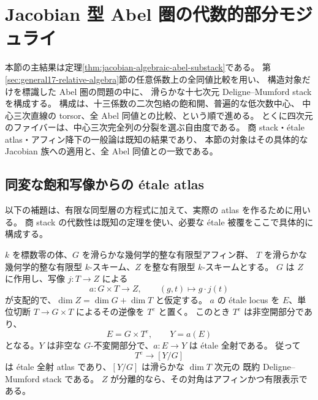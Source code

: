 \section{Jacobian 型 Abel 圏の代数的部分モジュライ}
\label{sec:jacobian-algebraic-chart}

本節の主結果は定理\ref{thm:jacobian-algebraic-abel-substack}である。
第\ref{sec:general17-relative-algebra}節の任意係数上の全同値比較を用い、
構造対象だけを標識した Abel 圏の問題の中に、
滑らかな十七次元 Deligne--Mumford stack を構成する。
構成は、十三係数の二次包絡の飽和開、普遍的な低次数中心、
中心三次直線の torsor、全 Abel 同値との比較、という順で進める。
とくに四次元のファイバーは、中心三次完全列の分裂を選ぶ自由度である。
商 stack・étale atlas・アフィン降下の一般論は既知の結果であり、
本節の対象はその具体的な Jacobian 族への適用と、全 Abel 同値との一致である。

\subsection{同変な飽和写像からの étale atlas}

以下の補題は、有限な同型層の方程式に加えて、実際の atlas を作るために用いる。
商 stack の代数性は既知の定理を使い、必要な étale 被覆をここで具体的に構成する。

\begin{lemma}[等次元な同変飽和写像]
\label{lem:equivariant-etale-saturation}
$k$ を標数零の体、$G$ を滑らかな幾何学的整な有限型アフィン群、
$T$ を滑らかな幾何学的整な有限型 $k$-スキーム、$Z$ を整な有限型 $k$-スキームとする。
$G$ は $Z$ に作用し、写像 $j:T\to Z$ による
\[
 a:G\times T\longrightarrow Z,\qquad(g,t)\longmapsto g\cdot j(t)
\]
が支配的で、$\dim Z=\dim G+\dim T$ と仮定する。
$a$ の étale locus を $E$、単位切断 $T\to G\times T$ によるその逆像を $T^e$ と置く。
このとき $T^e$ は非空開部分であり、
\[
 E=G\times T^e,\qquad Y=a(E)
\]
となる。$Y$ は非空な $G$-不変開部分で、$a:E\to Y$ は étale 全射である。
従って
\[
 T^e\longrightarrow[Y/G]
\]
は étale 全射 atlas であり、$[Y/G]$ は滑らかな $\dim T$ 次元の
既約 Deligne--Mumford stack である。
$Z$ が分離的なら、その対角はアフィンかつ有限表示である。
\end{lemma}

